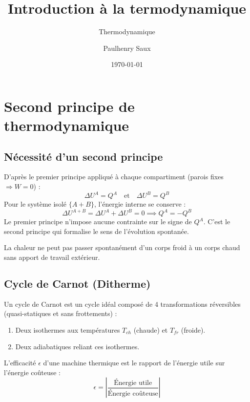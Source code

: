 \documentclass[french]{yLectureNote}
\title{Introduction à la termodynamique}
\subtitle{Thermodynamique}
\author{Paulhenry Saux}
\date{\today}
\begin{document}
\setcounter{chapter}{3}
\chapter{Second principe de thermodynamique}


\section{Nécessité d'un second principe}


D'après le premier principe appliqué à chaque compartiment (parois fixes $\Rightarrow W=0$) :
$$\Delta U^A = Q^A \quad \text{et} \quad \Delta U^B = Q^B$$
Pour le système isolé $\{A+B\}$, l'énergie interne se conserve :
$$\Delta U^{A+B} = \Delta U^A + \Delta U^B = 0 \implies Q^A = -Q^B$$
Le premier principe n'impose aucune contrainte sur le signe de $Q^A$. C'est le second principe qui formalise le sens de l'évolution spontanée.

\begin{theorem}
    La chaleur ne peut pas passer spontanément d'un corps froid à un corps chaud sans apport de travail extérieur.
\end{theorem}

\section{Cycle de Carnot (Ditherme)}

Un cycle de Carnot est un cycle idéal composé de 4 transformations réversibles (quasi-statiques et sans frottements) :
\begin{enumerate}
    \item Deux isothermes aux températures $T_{ch}$ (chaude) et $T_{fr}$ (froide).
    \item Deux adiabatiques reliant ces isothermes.
\end{enumerate}

\begin{definition}
    L'efficacité $\epsilon$ d'une machine thermique est le rapport de l'énergie utile sur l'énergie coûteuse :
    $$\epsilon = \left| \frac{\text{Énergie utile}}{\text{Énergie coûteuse}} \right|$$
\end{definition}
\end{document}
